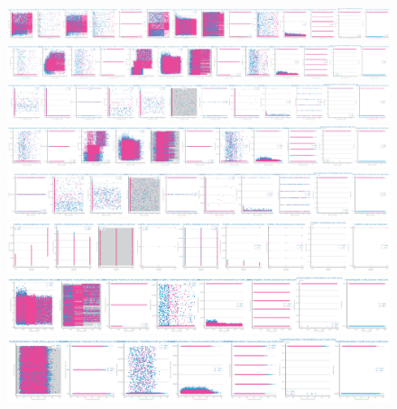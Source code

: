 \documentclass[10pt]{extarticle}
\begin{document}
\begin{figure}[H]
\includegraphics[scale=0.10]{images/dataset2/data_profiling/Credit_Score_sparsity_Type_of_Loan_per_class.png}
\includegraphics[scale=0.10]{images/dataset2/data_profiling/Credit_Score_sparsity_Delay_from_due_date_per_class.png}
\includegraphics[scale=0.10]{images/dataset2/data_profiling/Credit_Score_sparsity_NumofDelayedPayment_per_class.png}
\includegraphics[scale=0.10]{images/dataset2/data_profiling/Credit_Score_sparsity_ChangedCreditLimit_per_class.png}
\includegraphics[scale=0.10]{images/dataset2/data_profiling/Credit_Score_sparsity_NumCreditInquiries_per_class.png}
\includegraphics[scale=0.10]{images/dataset2/data_profiling/Credit_Score_sparsity_CreditMix_per_class.png}
\includegraphics[scale=0.10]{images/dataset2/data_profiling/Credit_Score_sparsity_OutstandingDebt_per_class.png}
\includegraphics[scale=0.10]{images/dataset2/data_profiling/Credit_Score_sparsity_CreditUtilizationRatio_per_class.png}

\end{figure}
\end{document}
